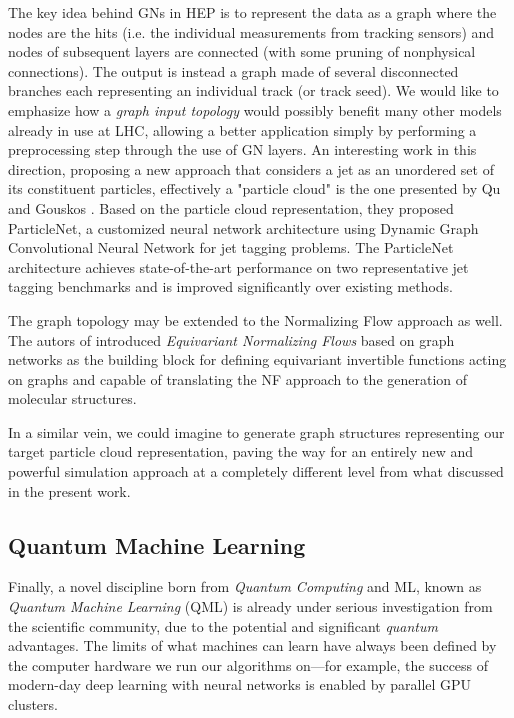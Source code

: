The key idea behind GNs in HEP is to represent the data as a graph where the nodes are the hits (i.e. the individual measurements from tracking sensors) and nodes of subsequent layers are connected (with some pruning of nonphysical connections). The output is instead a graph made of several disconnected branches each representing an
individual track (or track seed). We would like to emphasize how a \emph{graph input topology} would possibly benefit many other models already in use at LHC, allowing a better application simply by performing a preprocessing step through the use of GN layers. An interesting work in this direction, proposing a new approach that considers a jet as an unordered set of its constituent particles, effectively a "particle cloud" is the one presented by Qu and Gouskos \cite{pj2020}. Based on the particle cloud representation, they proposed ParticleNet, a customized neural network architecture using Dynamic Graph Convolutional Neural Network for jet tagging problems. The ParticleNet architecture achieves state-of-the-art performance on two representative jet tagging benchmarks and is improved significantly over existing methods. 

The graph topology may be extended to the Normalizing Flow approach as well. The autors of \cite{https://doi.org/10.48550/arxiv.2105.09016} introduced \emph{Equivariant Normalizing Flows} based on graph networks as the building block for defining equivariant invertible functions acting on graphs and capable of translating the NF approach to the generation of molecular structures.

In a similar vein, we could imagine to generate graph structures representing our target particle cloud representation, paving the way for an entirely new and powerful simulation approach at a completely different level from what discussed in the present work.

\subsection{Quantum Machine Learning}

Finally, a novel discipline born from \emph{Quantum Computing} and ML, known as \emph{Quantum Machine Learning} (QML) is already under serious investigation from the scientific community, due to the potential and significant \emph{quantum} advantages. The limits of what machines can learn have always been defined by the computer hardware we run our algorithms on—for example, the success of modern-day deep learning with neural networks is enabled by parallel GPU clusters.

